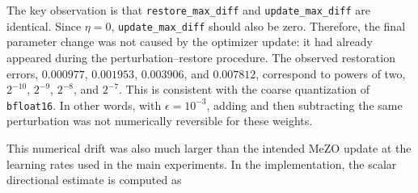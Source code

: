 \documentclass{article}
\begin{document}
\begin{table}[ht]
\centering
{}
\caption{Parameter restoration error in the auxiliary MeZO debugging run with zero learning rate. Even though no optimizer update should have been applied, the inspected \texttt{bfloat16} weight matrices were not restored exactly after zeroth-order perturbations.}
\label{tab:mezo-lr-zero-restore}
\end{table}

The key observation is that \texttt{restore\_max\_diff} and \texttt{update\_max\_diff} are identical. Since $\eta=0$, \texttt{update\_max\_diff} should also be zero. Therefore, the final parameter change was not caused by the optimizer update: it had already appeared during the perturbation--restore procedure. The observed restoration errors, $0.000977$, $0.001953$, $0.003906$, and $0.007812$, correspond to powers of two, $2^{-10}$, $2^{-9}$, $2^{-8}$, and $2^{-7}$. This is consistent with the coarse quantization of \texttt{bfloat16}. In other words, with $\epsilon=10^{-3}$, adding and then subtracting the same perturbation was not numerically reversible for these weights.

This numerical drift was also much larger than the intended MeZO update at the learning rates used in the main experiments. In the implementation, the scalar directional estimate is computed as
\end{document}
